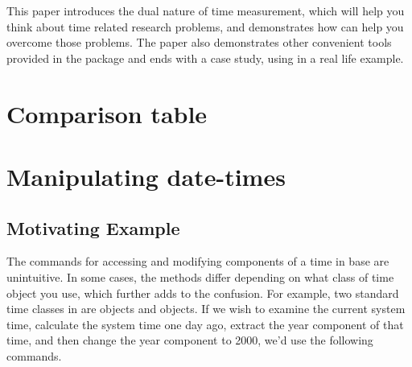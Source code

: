 \documentclass[article]{jss}
\begin{document}
This paper introduces the dual nature of time measurement, which will help you think about time related research problems, and demonstrates how  can help you overcome those problems. The paper also demonstrates other convenient tools provided in the  package and ends with a case study, using  in a real life example.


\section{Comparison table}




\section{Manipulating date-times} 
\label{sec:accessors}

\subsection{Motivating Example}
The commands for accessing and modifying components of a time in base  are unintuitive. In some cases, the methods differ depending on what class of time object you use, which further adds to the confusion. For example, two standard time classes in  are   objects and  objects. If we wish to examine the current system time, calculate the system time one day ago, extract the year component of that time, and then change the year component to 2000, we'd use the following commands.
\end{document}
